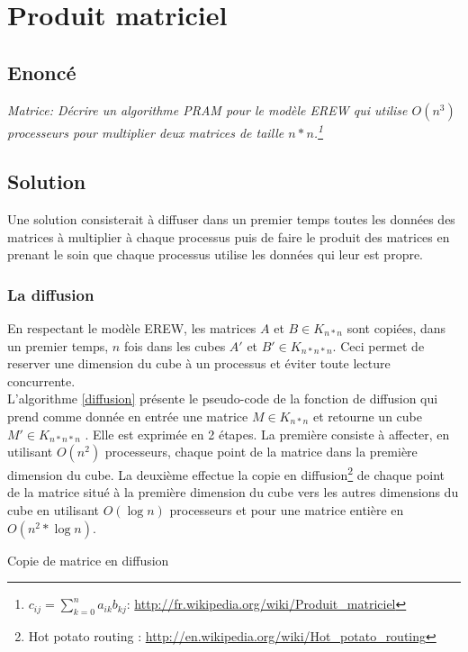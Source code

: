 \section{Produit matriciel}

\subsection{Enoncé}
\textit{Matrice: Décrire un algorithme PRAM pour le modèle EREW qui utilise $O(n^3)$ processeurs pour multiplier deux matrices de taille $n*n$.\footnote{$c_{ij} = \sum_{k=0}^n a_{ik} b_{kj}$: \url{http://fr.wikipedia.org/wiki/Produit_matriciel}}}

\subsection{Solution}
Une solution consisterait à diffuser dans un premier temps toutes les données des matrices à multiplier à chaque processus puis de faire le produit des matrices en prenant le soin que chaque processus utilise les données qui leur est propre.

\subsubsection{La diffusion}
En respectant le modèle EREW, les matrices $A$ et $B \in K_{n*n}$ sont copiées, dans un premier temps, $n$ fois dans les cubes $A'$ et $B' \in K_{n*n*n}$. Ceci permet de reserver une dimension du cube à un processus et éviter toute lecture concurrente.\\

L'algorithme \ref{diffusion} présente le pseudo-code de la fonction de diffusion qui prend comme donnée en entrée une matrice $M \in K_{n*n}$ et retourne un cube $M' \in K_{n*n*n}$ . Elle est exprimée en 2 étapes. La première consiste à affecter, en utilisant $O(n^2)$ processeurs, chaque point de la matrice dans la première dimension du cube. La deuxième effectue la copie en diffusion\footnote{Hot potato routing : \url{http://en.wikipedia.org/wiki/Hot_potato_routing}} de chaque point de la matrice situé à la première dimension du cube vers les autres dimensions du cube en utilisant $O(\log{n})$ processeurs et pour une matrice entière en $O(n^2 * \log{n})$.

\incmargin{1em}
\begin{algorithm}[here]
  \dontprintsemicolon
  \label{diffusion}
  \caption{Copie de matrice en diffusion}
\end{algorithm}
\decmargin{1em}

